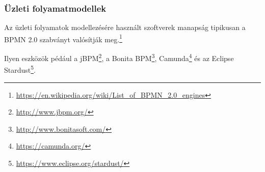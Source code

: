 \subsubsection{Üzleti folyamatmodellek}

Az üzleti folyamatok modellezésére használt szoftverek manapság tipikusan a BPMN 2.0 szabványt valósítják meg.\footnote{\url{https://en.wikipedia.org/wiki/List_of_BPMN_2.0_engines}}

Ilyen eszközök pédául a jBPM\footnote{\url{http://www.jbpm.org/}}, a Bonita BPM\footnote{\url{http://www.bonitasoft.com/}}, Camunda\footnote{\url{https://camunda.org/}} és az Eclipse Stardust\footnote{\url{https://www.eclipse.org/stardust/}}.
